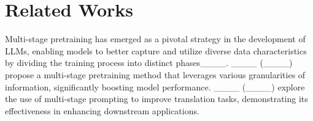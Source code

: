 \section{Related Works}


Multi-stage pretraining has emerged as a pivotal strategy in the development of LLMs, enabling models to better capture and utilize diverse data characteristics by dividing the training process into distinct phases____. ____ (____) propose a multi-stage pretraining method that leverages various granularities of information, significantly boosting model performance. ____ (____) explore the use of multi-stage prompting to improve translation tasks, demonstrating its effectiveness in enhancing downstream applications.

